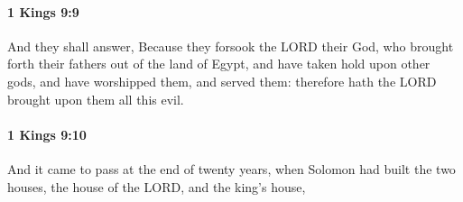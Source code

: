 		\paragraph{1 Kings 9:9} %
			\label{1KINGS-9-9}

			And they shall answer, Because they forsook the LORD their God, who brought forth their fathers out of the land of Egypt, and have taken hold upon other gods, and have worshipped them, and served them: therefore hath the LORD brought upon them all this evil.


		\paragraph{1 Kings 9:10} %
			\label{1KINGS-9-10}

			And it came to pass at the end of twenty years, when Solomon had built the two houses, the house of the LORD, and the king’s house,

